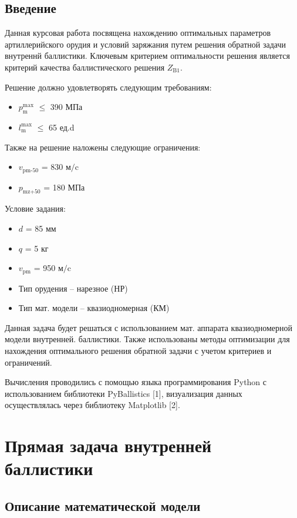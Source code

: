 \documentclass[14pt, a4paper]{report} %
\begin{document}
\tableofcontents

\newpage
\section*{Введение}
Данная курсовая работа посвящена нахождению оптимальных параметров артиллерийского орудия и условий заряжания путем решения обратной задачи внутреннй баллистики.
Ключевым критерием оптимальности решения является критерий качества баллистического решения $Z_{\text{B1}}$. 

Решение должно удовлетворять следующим требованиям: 
\begin{itemize}
    \item  $p_{\text{m}}^{\text{max}}$ $\leq$ 390 МПа
    \item $l_{\text{m}}^{\text{max}}$ $\leq$ 65 ед.d
\end{itemize}

Также на решение наложены следующие ограничения: 
\begin{itemize}
    \item  $v_{\text{pm-50}}$ = 830 $\text{м/c}$
    \item $p_{\text{mz+50}}$ = 180 МПа
\end{itemize}

Условие задания: 
\begin{itemize}
    \item $d$ = 85 мм
    \item $q$ = 5 кг
    \item $v_{\text{pm}}$ = 950 $\text{м/c}$
    \item Тип орудения -- нарезное (НР)
    \item Тип мат. модели -- квазиодномерная (КМ)
\end{itemize}

Данная задача будет решаться с использованием мат. аппарата квазиодномерной модели внутренней.
баллистики. Также использованы методы оптимизации для нахождения оптимального решения обратной задачи с учетом критериев и ограничений.

Вычисления проводились с помощью языка программирования Python с использованием библиотеки PyBallistics [1], визуализация данных осуществлялась 
через библиотеку Matplotlib [2].

\newpage
\chapter{Прямая задача внутренней баллистики}
\section{Описание математической модели}
\end{document}
